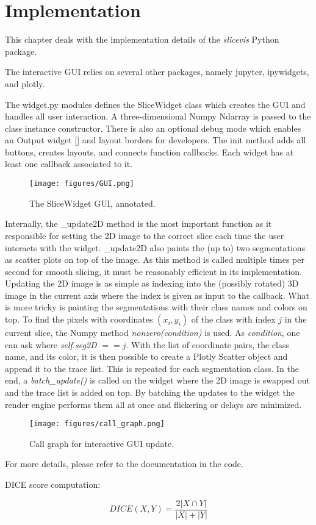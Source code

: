 \chapter{Implementation}
This chapter deals with the implementation details of the \emph{slicevis} Python package.

The interactive GUI relies on several other packages, namely jupyter, ipywidgets, and plotly.  

The widget.py modules defines the SliceWidget class which creates the GUI and handles all user interaction. A three-dimensional Numpy Ndarray is passed to the class instance constructor. There is also an optional debug mode which enables an Output widget [] and layout borders for developers. The init method adds all buttons, creates layouts, and connects function callbacks. Each widget has at least one callback associated to it.

\begin{figure}[h]
	\centering
	\texttt{[image: figures/GUI.png]}
	\caption{The SliceWidget GUI, annotated.}
\end{figure}

Internally, the \_update2D method is the most important function as it responsible for setting the 2D image to the correct slice each time the user interacts with the widget. \_update2D also paints the (up to) two segmentations as scatter plots on top of the image. As this method is called multiple times per second for smooth slicing, it must be reasonably efficient in its implementation. Updating the 2D image is as simple as indexing into the (possibly rotated) 3D image in the current axis where the index is given as input to the callback. What is more tricky is painting the segmentations with their class names and colors on top. To find the pixels with coordinates $(x_i , y_i)$ of the class with index $j$ in the current slice, the Numpy method \emph{nonzero(condition)} is used. As \emph{condition}, one can ask where \emph{self.seg2D} $== j$. With the list of coordinate pairs, the class name, and its color, it is then possible to create a Plotly Scatter object and append it to the trace list. This is repeated for each segmentation class. In the end, a \emph{batch\_update()} is called on the widget where the 2D image is swapped out and the trace list is added on top. By batching the updates to the widget the render engine performs them all at once and flickering or delays are minimized. 

\begin{figure}[h]
	\centering
	\texttt{[image: figures/call\_graph.png]}
	\caption{Call graph for interactive GUI update.}
\end{figure}

For more details, please refer to the documentation in the code.

DICE score computation:

\begin{equation}
	DICE(X, Y) =\frac{2|X \cap Y|}{|X|+|Y|}
\end{equation}